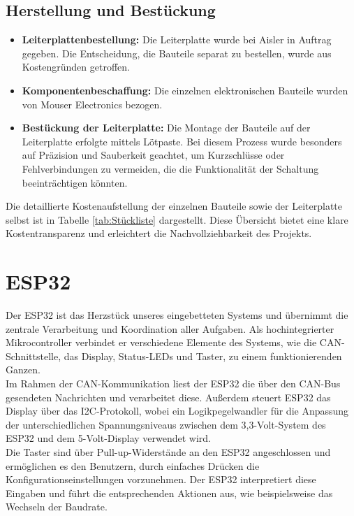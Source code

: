 \subsection{Herstellung und Bestückung}
\begin{itemize}
    \item \textbf{Leiterplattenbestellung:} Die Leiterplatte wurde bei Aisler in Auftrag gegeben. Die Entscheidung, die Bauteile separat zu bestellen, wurde aus Kostengründen getroffen.
    \item \textbf{Komponentenbeschaffung:} Die einzelnen elektronischen Bauteile wurden von Mouser Electronics bezogen.
    \item \textbf{Bestückung der Leiterplatte:} Die Montage der Bauteile auf der Leiterplatte erfolgte mittels Lötpaste. Bei diesem Prozess wurde besonders auf Präzision und Sauberkeit geachtet, um Kurzschlüsse oder Fehlverbindungen zu vermeiden, die die Funktionalität der Schaltung beeinträchtigen könnten.
\end {itemize}

\noindent Die detaillierte Kostenaufstellung der einzelnen Bauteile sowie der Leiterplatte selbst ist in Tabelle \ref{tab:Stückliste} dargestellt. Diese Übersicht bietet eine klare Kostentransparenz und erleichtert die Nachvollziehbarkeit des Projekts.\\

\section{ESP32}
Der ESP32 ist das Herzstück unseres eingebetteten Systems und übernimmt die zentrale Verarbeitung und Koordination aller Aufgaben. Als hochintegrierter Mikrocontroller verbindet er verschiedene Elemente des Systems, wie die CAN-Schnittstelle, das Display, Status-LEDs und Taster, zu einem funktionierenden Ganzen.\\

\noindent Im Rahmen der CAN-Kommunikation liest der ESP32 die über den CAN-Bus gesendeten Nachrichten und verarbeitet diese. Außerdem steuert ESP32 das Display über das I2C-Protokoll, wobei ein Logikpegelwandler für die Anpassung der unterschiedlichen Spannungsniveaus zwischen dem 3,3-Volt-System des ESP32 und dem 5-Volt-Display verwendet wird.\\

\noindent Die Taster sind über Pull-up-Widerstände an den ESP32 angeschlossen und ermöglichen es den Benutzern, durch einfaches Drücken die Konfigurationseinstellungen vorzunehmen. Der ESP32 interpretiert diese Eingaben und führt die entsprechenden Aktionen aus, wie beispielsweise das Wechseln der Baudrate.\\

